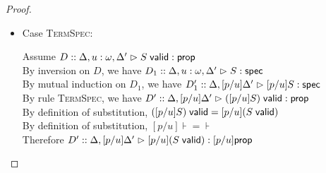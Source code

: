 \begin{proof}
\begin{enumerate}
\begin{itemize}
    \item Case \textsc{TermSpec}: 
      \begin{tabbedproof}
        \oo Assume $D :: \judgeA[{\Delta, u:\omega, \Delta'}]{\validprop{S}}{\assert}$ \\
        \ooo By inversion on $D$, we have
             $D_1 :: \judgeS[{\Delta, u:\omega, \Delta'}]{S}$ \\
        \ooo By mutual induction on $D_1$, we have 
             $D'_1 :: \judgeS[{\Delta, [p/u]\Delta'}]{[p/u]S}$ \\
        \ooo By rule \textsc{TermSpec}, we have 
             $D' :: \judgeA[{\Delta, [p/u]\Delta'}]{\validprop{([p/u]S)}}{\assert}$ \\
        \ooo By definition of substitution, $\validprop{([p/u]S)} = [p/u](\validprop{S})$ \\
        \ooo By definition of substitution, $[p/u]\assert = \assert$ \\
        \ooo Therefore 
             $D' :: \judgeA[{\Delta, [p/u]\Delta'}]{[p/u](\validprop{S})}{[p/u]\assert}$ \\
      \end{tabbedproof}
    \end{itemize}


\end{enumerate}
\end{proof}
